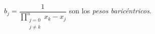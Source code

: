 \begin{frame}
\begin{definition}
\begin{columns}
\begin{column}{.45\paperwidth}
\begin{itemize}
					      \begin{math}
						      b_{j}=
						      \dfrac{1}{
						      \prod\limits_{\substack{j=0\\j\neq k}}^{n}
						      x_{k}-x_{j}
						      }
					      \end{math}
					      son los \emph{pesos baricéntricos}.
				\end{itemize}
			\end{column}
		\end{columns}
	\end{definition}
\end{frame}